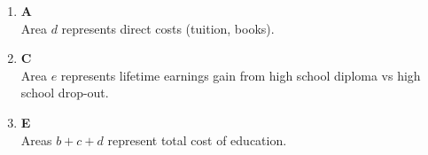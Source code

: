 \documentclass[12pt]{article}
\begin{document}
\begin{enumerate}
\begin{itemize}
    \item The firm chooses employment where:
    \[
    MCL = VMP
    \]
    
    \item This determines employment \(N_M\).
    
    \item The wage is then determined from the labour supply curve at that level of employment, giving wage \(W_M\).
\end{itemize}


Vacancies arise when there is \textbf{excess demand for labour}:
\[
\text{Vacancies} = N^d - N^s
\]

In a monopsony:

\begin{itemize}
    \item The firm sets both wage and employment optimally.
    \item It hires exactly the number of workers it wants at the chosen wage.
    \item Workers are willing to supply exactly that amount of labour at \(W_M\).
\end{itemize}

Therefore:

\[
N^d = N^s \quad \text{at the monopsony equilibrium}
\]



Even though the monopsony equilibrium is \textbf{inefficient} relative to the competitive outcome:

\begin{itemize}
    \item It is still an \textbf{equilibrium} from the firm's perspective.
    \item There is \textbf{no excess demand or excess supply}.
    \item Hence, there are \textbf{no vacancies}.
\end{itemize}

\subsection*{Conclusion}

\[
\boxed{\text{The number of vacancies in a monopsony equilibrium is zero.}}
\]

Thus, the correct answer is:

\[
\boxed{\text{A}}
\]

\item \textbf{A} \\
Area $d$ represents direct costs (tuition, books).

\item \textbf{C} \\
Area $e$ represents lifetime earnings gain from high school diploma vs high school drop-out.

\item \textbf{E} \\
Areas $b + c + d$ represent total cost of education.

\end{enumerate}
\end{document}
